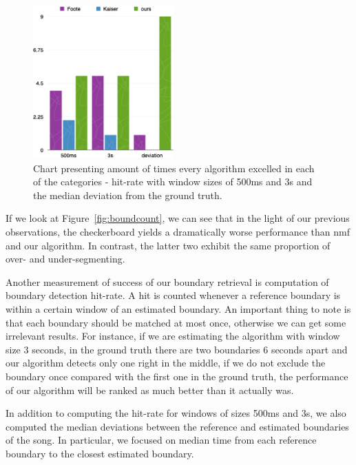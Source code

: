 \begin{figure}
\vspace{-30pt}
  \begin{center}
    \includegraphics[width=0.48\textwidth]{Figures/structurechamps}
  \end{center}
  \caption{Chart presenting amount of times every algorithm excelled in each of the categories - hit-rate with window sizes of 500ms and 3s and the median deviation from the ground truth.}
\label{fig:structurechamps}
\end{figure}


If we look at Figure~\ref{fig:boundcount}, we can see that in the light of our previous observations, the checkerboard yields a dramatically worse performance than nmf and our algorithm. In contrast, the latter two exhibit the same proportion of over- and under-segmenting.

Another measurement of success of our boundary retrieval is computation of boundary detection hit-rate. A hit is counted whenever a reference boundary is within a certain window of an estimated boundary. An important thing to note is that each boundary should be matched at most once, otherwise we can get some irrelevant results. For instance, if we are estimating the algorithm with window size 3 seconds, in the ground truth there are two boundaries 6 seconds apart and our algorithm detects only one right in the middle, if we do not exclude the boundary once compared with the first one in the ground truth, the performance of our algorithm will be ranked as much better than it actually was. 

In addition to computing the hit-rate for windows of sizes 500ms and 3s, we also computed the median deviations between the reference and estimated boundaries of the song. In particular, we focused on median time from each reference boundary to the closest estimated boundary.

